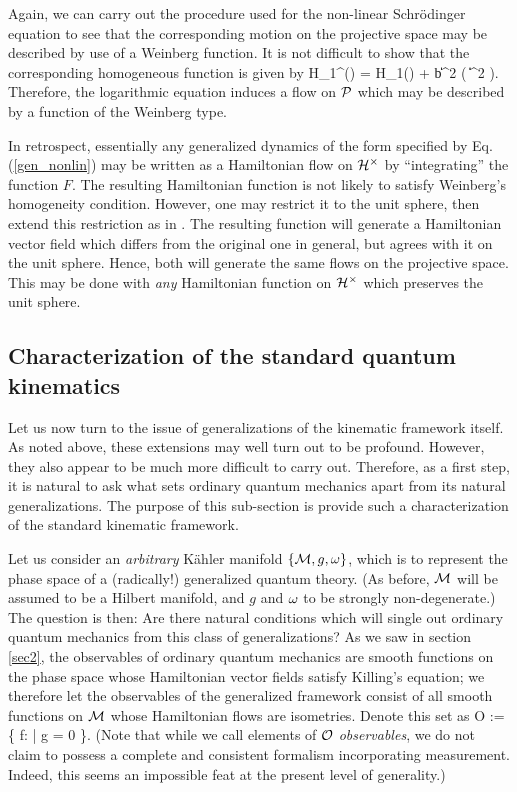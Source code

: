 Again, we can carry out the procedure used for the non-linear
Schr\"odinger equation to see that the corresponding motion on the
projective space may be described by use of a Weinberg function.  It
is not difficult to show that the corresponding homogeneous function
is given by
%
\be
 H_1^\prime(\Psi) = H_1(\Psi) + b\|\Psi\|^2 \ln( \| \Psi \|^2 ).
\ee
%
Therefore, the logarithmic equation induces a flow on $\P$ which may
be described by a function of the Weinberg type.

In retrospect, essentially any generalized dynamics of the form
specified by Eq. (\ref{gen_nonlin}) may be written as a Hamiltonian
flow on $\punctH$ by ``integrating'' the function $F$.  The resulting
Hamiltonian function is not likely to satisfy Weinberg's homogeneity
condition.  However, one may restrict it to the unit sphere, then
extend this restriction as in .  The resulting function
will generate a Hamiltonian vector field which differs from the
original one in general, but agrees with it on the unit sphere.
Hence, both will generate the same flows on the projective space.
This may be done with {\em any} Hamiltonian function on $\punctH$
which preserves the unit sphere.




\subsection{Characterization of the standard quantum kinematics}
\label{sec3.B}					

Let us now turn to the issue of generalizations of the kinematic
framework itself. As noted above, these extensions may well turn out
to be profound. However, they also appear to be much more difficult to
carry out. Therefore, as a first step, it is natural to ask what sets
ordinary quantum mechanics apart from its natural generalizations.
The purpose of this sub-section is provide such a characterization of
the standard kinematic framework.

Let us consider an {\em arbitrary} K\"ahler manifold $\{ \M, g, \w
\}$, which is to represent the phase space of a (radically!)
generalized quantum theory. (As before, $\M$ will be assumed to be a
Hilbert manifold, and $g$ and $\w$ to be strongly non-degenerate.)
The question is then: Are there natural conditions which
will single out ordinary quantum mechanics from this class of
generalizations?  As we saw in section \ref{sec2}, the observables of
ordinary quantum mechanics are smooth functions on the phase space
whose Hamiltonian vector fields satisfy Killing's equation; we
therefore let the observables of the generalized framework consist of
all smooth functions on $\M$ whose Hamiltonian flows are
isometries. Denote this set as
%
\be
  {\cal O} := \{ f: \M \mapsto \R \; | \;  g = 0 \}.
\ee
%
(Note that while we call elements of ${\cal O}$ {\em observables},
we do not claim to possess a complete and consistent formalism
incorporating measurement. Indeed, this seems an impossible feat at
the present level of generality.)

